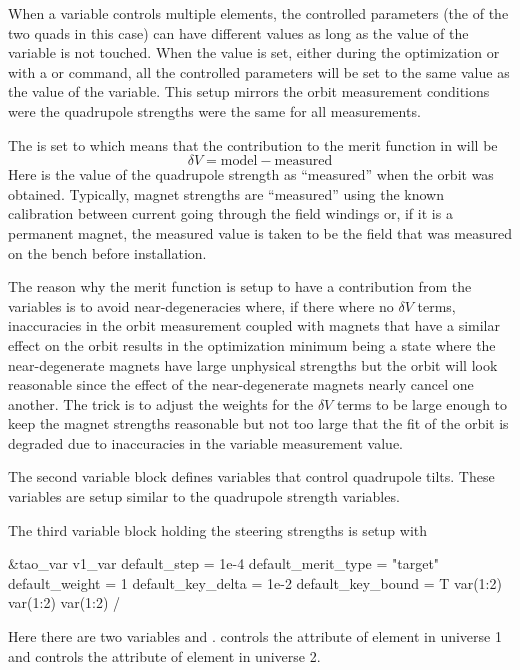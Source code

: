 \documentclass{hitec}     %
\begin{document}
{When a variable controls multiple elements, the controlled parameters (the  of the two
 quads in this case) can have different values as long as the  value of the
variable is not touched. When the  value is set, either during the optimization or with a
 or  command, all the controlled parameters will be set to the same value as the
 value of the variable.  This setup mirrors the orbit measurement conditions were the
quadrupole strengths were the same for all measurements.

The  is set to  which means that the contribution to the merit function in 
will be 
\begin{equation}
  \delta V = \mbox{model} - \mbox{measured}
\end{equation}
Here  is the value of the quadrupole strength as ``measured'' when the orbit was
obtained.  Typically, magnet strengths are ``measured'' using the known calibration between current
going through the field windings or, if it is a permanent magnet, the measured value is taken to be
the field that was measured on the bench before installation. 

The reason why the merit function is setup to have a contribution from the variables is to avoid
near-degeneracies where, if there where no $\delta V$ terms, inaccuracies in the orbit measurement
coupled with magnets that have a similar effect on the orbit results in the optimization minimum
being a state where the near-degenerate magnets have large unphysical strengths but the 
orbit will look reasonable since the effect of the near-degenerate magnets nearly cancel one
another. The trick is to adjust the weights for the $\delta V$ terms to be large enough to keep the
magnet strengths reasonable but not too large that the fit of the orbit is degraded due to
inaccuracies in the variable measurement value.

The second variable block defines variables that control quadrupole tilts. These variables are setup
similar to the quadrupole strength variables.

The third variable block holding the steering strengths is setup with
\begin{code}
&tao_var
  v1_var%
  default_step = 1e-4
  default_merit_type = "target"
  default_weight = 1
  default_key_delta = 1e-2
  default_key_bound = T
  var(1:2)%
  var(1:2)%
  var(1:2)%
/
\end{code}
Here there are two variables  and .  controls the
 attribute of element  in universe 1 and  controls the
 attribute of element  in universe 2.

}
\end{document}
